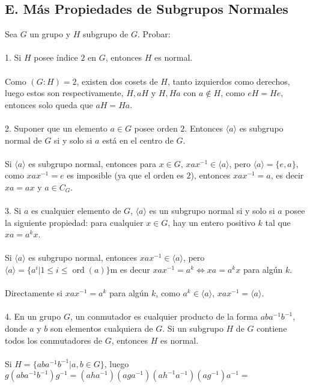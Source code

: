 \documentclass{article}
\begin{document}
\subsection*{E. Más Propiedades de Subgrupos Normales}
Sea $G$ un grupo y $H$ subgrupo de $G$. Probar:
\\
\\
1. Si $H$ posee índice $2$ en $G$, entonces $H$ es normal.
\\
\\
Como $(G:H)=2$, existen dos cosets de $H$, tanto izquierdos como derechos, luego estos son respectivamente, $H,aH$ y $H,Ha$ con $a \notin H$, como $eH=He$, entonces solo queda que $aH=Ha$.
\\
\\
2. Suponer que un elemento $a \in G$ posee orden $2$. Entonces $\langle a \rangle$ es subgrupo normal de $G$ si y solo si $a$ está en el centro de $G$.
\\
\\
Si $\langle a \rangle$ es subgrupo normal, entonces para $x \in G$, $xax^{-1} \in \langle a \rangle$, pero $\langle a \rangle = \{e,a \}$, como $xax^{-1}=e$ es imposible (ya que el orden es $2$), entonces $xax^{-1}=a$, es decir $xa=ax$ y $a \in C_{G}$.
\\
\\
3. Si $a$ es cualquier elemento de $G$, $\langle a \rangle$ es un subgrupo normal si y solo si $a$ posee la siguiente propiedad: para cualquier $x \in G$, hay un entero positivo $k$ tal que $xa=a^{k}x$.
\\
\\
Si $\langle a \rangle$ es subgrupo normal, entonces $xax^{-1} \in \langle a \rangle$, pero $\langle a \rangle = \{a^{i}| 1\leq i \leq \operatorname{ord}{(a)}\}$m es decur $xax^{-1}=a^{k} \Longleftrightarrow xa=a^{k}x$ para algún $k$.
\\
\\
Directamente si $xax^{-1}=a^{k}$ para algún $k$, como $a^{k} \in \langle a \rangle$, $xax^{-1}=\langle a \rangle$.
\\
\\
4. En un grupo $G$, un conmutador es cualquier producto de la forma $aba^{-1}b^{-1}$, donde $a$ y $b$ son elementos cualquiera de $G$. Si un subgrupo $H$ de $G$ contiene todos los conmutadores de $G$, entonces $H$ es normal.
\\
\\
Si $H=\{aba^{-1}b^{-1} | a,b \in G \}$, luego $g(aba^{-1}b^{-1})g^{-1}=(aha^{-1})(aga^{-1})(ah^{-1}a^{-1})(ag^{-1})a^{-1}=$
\\
\end{document}
